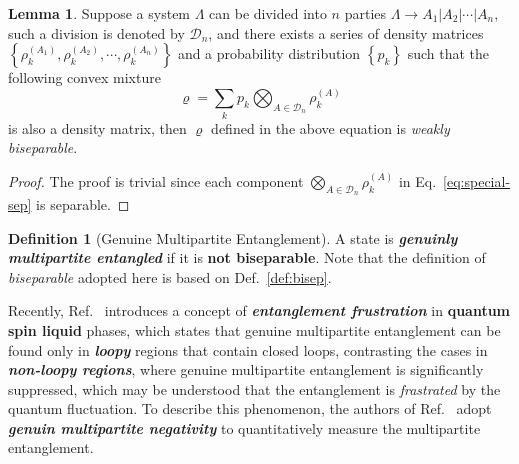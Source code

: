 \documentclass[12font]{article}
\theoremstyle{definition}
\newtheorem{definition}{Definition}[section]
\newtheorem{lemma}[theorem]{Lemma}
\newcommand{\lrg}[1]{\left\{  #1  \right\}}
\begin{document}
\begin{lemma}
    Suppose a system $\Lambda$ can be divided into $n$ parties $\Lambda \to A_1|A_2|\cdots|A_n$, such a division is denoted by $\mathcal{D}_n$, and there exists a series of density matrices $\lrg{\rho^{(A_1)}_k, \rho^{(A_2)}_k,\cdots,\rho^{(A_n)}_k}$ and a probability distribution $\lrg{p_k}$ such that the following convex mixture
    \begin{equation}\label{eq:special-sep}
        \varrho = \sum_{k} p_k \bigotimes_{A\in\mathcal{D}_n}\rho^{(A)}_k 
    \end{equation}
    is also a density matrix, then $\varrho$ defined in the above equation is \textit{weakly biseparable}.
\end{lemma}
\begin{proof}
    The proof is trivial since each component $\bigotimes_{A\in\mathcal{D}_n}\rho^{(A)}_k$ in Eq.~\eqref{eq:special-sep} is separable. 
\end{proof}

\begin{definition}[Genuine Multipartite Entanglement]\label{def:GME}
    A state is \textbf{\textit{genuinly multipartite entangled}} if it is \textbf{not biseparable}. Note that the definition of \textit{biseparable} adopted here is based on Def.~\ref{def:bisep}.
\end{definition}



Recently, Ref.~\cite{Lyu-Chandorkar-Kapoor-Takei-Sorensen-Witczak-Krempa_2026} introduces a concept of \textbf{\textit{entanglement frustration}} in \textbf{quantum spin liquid} phases, which states that genuine multipartite entanglement can be found only in \textbf{\textit{loopy}} regions that contain closed loops, contrasting the cases in \textbf{\textit{non-loopy regions}}, where genuine multipartite entanglement is significantly suppressed, which may be understood that the entanglement is \textit{frastrated} by the quantum fluctuation. To describe this phenomenon, the authors of Ref.~\cite{Lyu-Chandorkar-Kapoor-Takei-Sorensen-Witczak-Krempa_2026} adopt \textbf{\textit{genuin multipartite negativity}} to quantitatively measure the multipartite entanglement.
\end{document}
